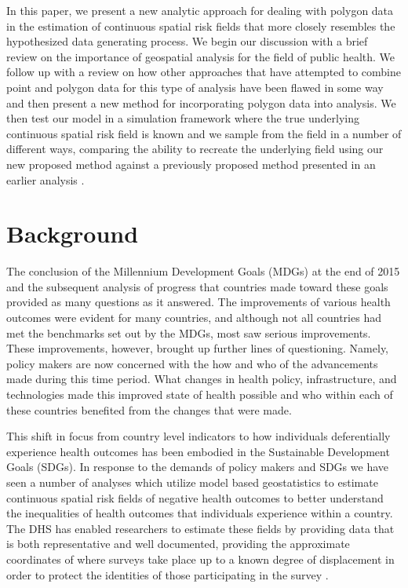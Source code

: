 \documentclass{article}
\begin{document}
In this paper, we present a new analytic approach for dealing with polygon data in the estimation of continuous spatial risk fields that more closely resembles the hypothesized data generating process. We begin our discussion with a brief review on the importance of geospatial analysis for the field of public health. We follow up with a review on how other approaches that have attempted to combine point and polygon data for this type of analysis have been flawed in some way and then present a new method for incorporating polygon data into analysis. We then test our model in a simulation framework where the true underlying continuous spatial risk field is known and we sample from the field in a number of different ways, comparing the ability to recreate the underlying field using our new proposed method against a previously proposed method presented in an earlier analysis \cite{Utazi2018a}.

\section{Background}\label{background}

The conclusion of the Millennium Development Goals (MDGs) at the end of 2015 and the subsequent analysis of progress that countries made toward these goals provided as many questions as it answered. The improvements of various health outcomes were evident for many countries, and although not all countries had met the benchmarks set out by the MDGs, most saw serious improvements. These improvements, however, brought up further lines of questioning. Namely, policy makers are now concerned with the how and who of the advancements made during this time period. What changes in health policy, infrastructure, and technologies made this improved state of health possible and who within each of these countries benefited from the changes that were made. 

This shift in focus from country level indicators to how individuals deferentially experience health outcomes has been embodied in the Sustainable Development Goals (SDGs). In response to the demands of policy makers and SDGs we have seen a number of analyses which utilize model based geostatistics to estimate continuous spatial risk fields of negative health outcomes to better understand the inequalities of health outcomes that individuals experience within a country. The DHS has enabled researchers to estimate these fields by providing data that is both representative and well documented, providing the approximate coordinates of where surveys take place up to a known degree of displacement in order to protect the identities of those participating in the survey \cite{Burgert-Brucker2016, Gething2015}. 
\end{document}
